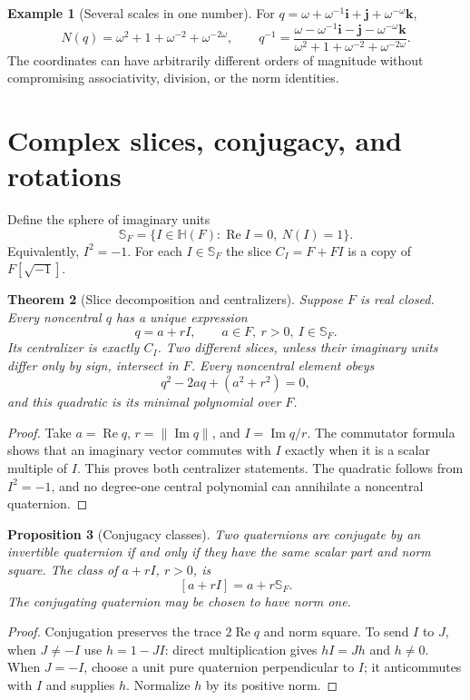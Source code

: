 \documentclass[11pt,letterpaper]{article}
\newtheorem{theorem}{Theorem}[section]
\newtheorem{proposition}[theorem]{Proposition}
\theoremstyle{definition}
\newtheorem{example}[theorem]{Example}
\newcommand{\HH}{\mathbb H}
\newcommand{\ii}{\mathbf i}
\newcommand{\jj}{\mathbf j}
\newcommand{\kk}{\mathbf k}
\newcommand{\Ss}{\mathbb S_F}
\newcommand{\norm}[1]{\left\lVert#1\right\rVert}
\DeclareMathOperator{\Rea}{Re}
\DeclareMathOperator{\Imag}{Im}
\begin{document}
\begin{example}[Several scales in one number]
For $q=\omega+\omega^{-1}\ii+\jj+\omega^{-\omega}\kk$,
\[
 N(q)=\omega^2+1+\omega^{-2}+\omega^{-2\omega},\qquad
 q^{-1}=\frac{\omega-\omega^{-1}\ii-\jj-\omega^{-\omega}\kk}
 {\omega^2+1+\omega^{-2}+\omega^{-2\omega}}.
\]
The coordinates can have arbitrarily different orders of magnitude without
compromising associativity, division, or the norm identities.
\end{example}

\section{Complex slices, conjugacy, and rotations}
\label{sec:slices}
Define the sphere of imaginary units
\[
 \Ss=\{I\in\HH(F):\Rea I=0,\ N(I)=1\}.
\]
Equivalently, $I^2=-1$. For each $I\in\Ss$ the slice $C_I=F+FI$ is a copy of
$F[\sqrt{-1}]$.

\begin{theorem}[Slice decomposition and centralizers]
\label{thm:slices}
Suppose $F$ is real closed. Every noncentral $q$ has a unique expression
\[
 q=a+rI,\qquad a\in F,\ r>0,\ I\in\Ss.
\]
Its centralizer is exactly $C_I$. Two different slices, unless their imaginary
units differ only by sign, intersect in $F$. Every noncentral element obeys
\[
 q^2-2a q+(a^2+r^2)=0,
\]
and this quadratic is its minimal polynomial over $F$.
\end{theorem}
\begin{proof}
Take $a=\Rea q$, $r=\norm{\Imag q}$, and $I=\Imag q/r$. The commutator formula
shows that an imaginary vector commutes with $I$ exactly when it is a scalar
multiple of $I$. This proves both centralizer statements. The quadratic follows
from $I^2=-1$, and no degree-one central polynomial can annihilate a noncentral
quaternion.
\end{proof}

\begin{proposition}[Conjugacy classes]
\label{prop:conjugacy}
Two quaternions are conjugate by an invertible quaternion if and only if they
have the same scalar part and norm square. The class of $a+rI$, $r>0$, is
\[
 [a+rI]=a+r\Ss.
\]
The conjugating quaternion may be chosen to have norm one.
\end{proposition}
\begin{proof}
Conjugation preserves the trace $2\Rea q$ and norm square. To send $I$ to $J$,
when $J\ne-I$ use $h=1-JI$: direct multiplication gives $hI=Jh$ and
$h\ne0$. When $J=-I$, choose a unit pure quaternion perpendicular to $I$; it
anticommutes with $I$ and supplies $h$. Normalize $h$ by its positive norm.
\end{proof}
\end{document}
